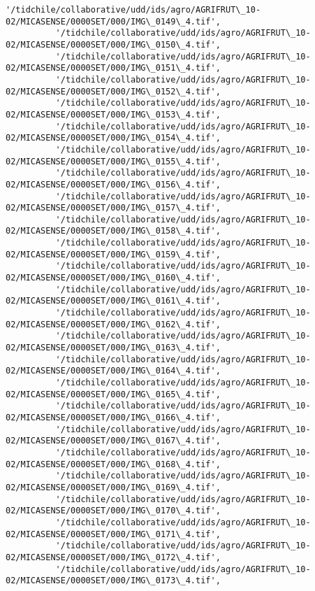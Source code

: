 \documentclass[11pt]{article}
\begin{document}
\begin{Verbatim}[commandchars=\\\{\}]
          '/tidchile/collaborative/udd/ids/agro/AGRIFRUT\_10-02/MICASENSE/0000SET/000/IMG\_0149\_4.tif',
          '/tidchile/collaborative/udd/ids/agro/AGRIFRUT\_10-02/MICASENSE/0000SET/000/IMG\_0150\_4.tif',
          '/tidchile/collaborative/udd/ids/agro/AGRIFRUT\_10-02/MICASENSE/0000SET/000/IMG\_0151\_4.tif',
          '/tidchile/collaborative/udd/ids/agro/AGRIFRUT\_10-02/MICASENSE/0000SET/000/IMG\_0152\_4.tif',
          '/tidchile/collaborative/udd/ids/agro/AGRIFRUT\_10-02/MICASENSE/0000SET/000/IMG\_0153\_4.tif',
          '/tidchile/collaborative/udd/ids/agro/AGRIFRUT\_10-02/MICASENSE/0000SET/000/IMG\_0154\_4.tif',
          '/tidchile/collaborative/udd/ids/agro/AGRIFRUT\_10-02/MICASENSE/0000SET/000/IMG\_0155\_4.tif',
          '/tidchile/collaborative/udd/ids/agro/AGRIFRUT\_10-02/MICASENSE/0000SET/000/IMG\_0156\_4.tif',
          '/tidchile/collaborative/udd/ids/agro/AGRIFRUT\_10-02/MICASENSE/0000SET/000/IMG\_0157\_4.tif',
          '/tidchile/collaborative/udd/ids/agro/AGRIFRUT\_10-02/MICASENSE/0000SET/000/IMG\_0158\_4.tif',
          '/tidchile/collaborative/udd/ids/agro/AGRIFRUT\_10-02/MICASENSE/0000SET/000/IMG\_0159\_4.tif',
          '/tidchile/collaborative/udd/ids/agro/AGRIFRUT\_10-02/MICASENSE/0000SET/000/IMG\_0160\_4.tif',
          '/tidchile/collaborative/udd/ids/agro/AGRIFRUT\_10-02/MICASENSE/0000SET/000/IMG\_0161\_4.tif',
          '/tidchile/collaborative/udd/ids/agro/AGRIFRUT\_10-02/MICASENSE/0000SET/000/IMG\_0162\_4.tif',
          '/tidchile/collaborative/udd/ids/agro/AGRIFRUT\_10-02/MICASENSE/0000SET/000/IMG\_0163\_4.tif',
          '/tidchile/collaborative/udd/ids/agro/AGRIFRUT\_10-02/MICASENSE/0000SET/000/IMG\_0164\_4.tif',
          '/tidchile/collaborative/udd/ids/agro/AGRIFRUT\_10-02/MICASENSE/0000SET/000/IMG\_0165\_4.tif',
          '/tidchile/collaborative/udd/ids/agro/AGRIFRUT\_10-02/MICASENSE/0000SET/000/IMG\_0166\_4.tif',
          '/tidchile/collaborative/udd/ids/agro/AGRIFRUT\_10-02/MICASENSE/0000SET/000/IMG\_0167\_4.tif',
          '/tidchile/collaborative/udd/ids/agro/AGRIFRUT\_10-02/MICASENSE/0000SET/000/IMG\_0168\_4.tif',
          '/tidchile/collaborative/udd/ids/agro/AGRIFRUT\_10-02/MICASENSE/0000SET/000/IMG\_0169\_4.tif',
          '/tidchile/collaborative/udd/ids/agro/AGRIFRUT\_10-02/MICASENSE/0000SET/000/IMG\_0170\_4.tif',
          '/tidchile/collaborative/udd/ids/agro/AGRIFRUT\_10-02/MICASENSE/0000SET/000/IMG\_0171\_4.tif',
          '/tidchile/collaborative/udd/ids/agro/AGRIFRUT\_10-02/MICASENSE/0000SET/000/IMG\_0172\_4.tif',
          '/tidchile/collaborative/udd/ids/agro/AGRIFRUT\_10-02/MICASENSE/0000SET/000/IMG\_0173\_4.tif',

\end{Verbatim}
\end{document}
